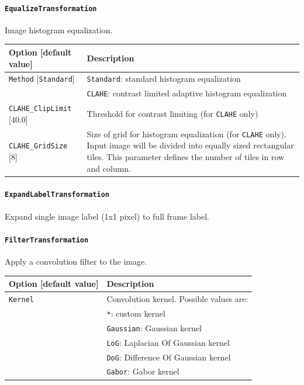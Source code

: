 \documentclass[a4paper,11pt,oneside]{article}
\newcommand{\iponly}{\reversemarginpar
    \marginnote{\color{listletiblue}\normalfont\scriptsize
    {\ttfamily{}\hyperref[sec:N2D2-IP]{\color{listletiblue}N2D2 IP}} \emph{only}}}
\begin{document}
\paragraph{\texorpdfstring{%
\lstinline[basicstyle=\ttfamily\bfseries]!EqualizeTransformation!%
\protect\iponly}{EqualizeTransformation}}
Image histogram equalization.

\begin{center}
 \begin{tabular}{| p{5cm} | p{10cm} | }
 \hline
 Option [default value] & Description\\
 \hline\hline
  \lstinline!Method! [\lstinline!Standard!] & \lstinline!Standard!: standard
  histogram equalization \\
   & \lstinline!CLAHE!: contrast limited adaptive histogram equalization \\
  \lstinline!CLAHE_ClipLimit! [40.0] & Threshold for contrast limiting
  (for \lstinline!CLAHE! only) \\
  \lstinline!CLAHE_GridSize! [8] & Size of grid for histogram equalization
   (for \lstinline!CLAHE! only).
  Input image will be divided into equally sized rectangular tiles.
  This parameter defines the number of tiles in row and column. \\
 \hline
\end{tabular}
\end{center}


\paragraph{\texorpdfstring{%
\lstinline[basicstyle=\ttfamily\bfseries]!ExpandLabelTransformation!%
\protect\iponly}{ExpandLabelTransformation}}
Expand single image label (1x1 pixel) to full frame label.


\paragraph{\texorpdfstring{%
\lstinline[basicstyle=\ttfamily\bfseries]!FilterTransformation!}
{FilterTransformation}}
Apply a convolution filter to the image.

\begin{center}
 \begin{tabular}{| p{5cm} | p{10cm} | }
 \hline
 Option [default value] & Description\\
 \hline\hline
  \cellcolor{requiredcolor}\lstinline!Kernel! & Convolution kernel.
  Possible values are: \\
   & \lstinline!*!: custom kernel \\
   & \lstinline!Gaussian!: Gaussian kernel \\
   & \lstinline!LoG!: Laplacian Of Gaussian kernel \\
   & \lstinline!DoG!: Difference Of Gaussian kernel \\
   & \lstinline!Gabor!: Gabor kernel \\
 \hline
\end{tabular}
\end{center}
\end{document}
